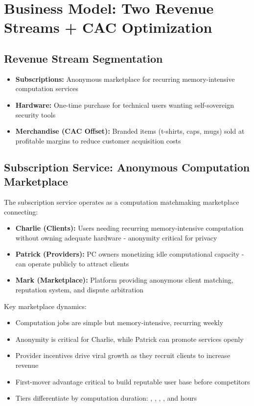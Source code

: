 
\section{Business Model: Two Revenue Streams + CAC Optimization}

\subsection{Revenue Stream Segmentation}
\begin{itemize}
  \item \textbf{Subscriptions:} Anonymous marketplace for recurring memory-intensive computation services
  \item \textbf{Hardware:} One-time purchase for technical users wanting self-sovereign security tools
  \item \textbf{Merchandise (CAC Offset):} Branded items (t-shirts, caps, mugs) sold at profitable margins to reduce customer acquisition costs
\end{itemize}

\subsection{Subscription Service: Anonymous Computation Marketplace}
The subscription service operates as a computation matchmaking marketplace connecting:
\begin{itemize}
  \item \textbf{Charlie (Clients):} Users needing recurring memory-intensive computation without owning adequate hardware - anonymity critical for privacy
  \item \textbf{Patrick (Providers):} PC owners monetizing idle computational capacity - can operate publicly to attract clients
  \item \textbf{Mark (Marketplace):} Platform providing anonymous client matching, reputation system, and dispute arbitration
\end{itemize}

Key marketplace dynamics:
\begin{itemize}
  \item Computation jobs are simple but memory-intensive, recurring weekly
  \item Anonymity is critical for Charlie, while Patrick can promote services openly
  \item Provider incentives drive viral growth as they recruit clients to increase revenue\cite{parker2016}
  \item First-mover advantage critical to build reputable user base before competitors
  \item Tiers differentiate by computation duration: \numint{\computeHoursBasic}, \numint{\computeHoursMedium}, \numint{\computeHoursProfessional}, \numint{\computeHoursGolden}, and \numint{\computeHoursPlatinum} hours
\end{itemize}

